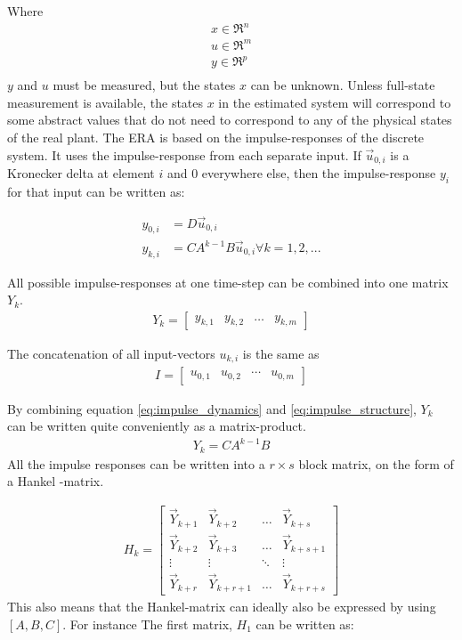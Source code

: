 Where 
\begin{align*}
    x \in \Re^n \\
    u \in \Re^m \\
    y \in \Re^p \\
\end{align*}
\noindent
$y$ and $u$ must be measured, but the states $x$ can be unknown. Unless full-state measurement is available, the states $x$ in the estimated system will correspond to some abstract values that do not need to correspond to any of the physical states of the real plant. The ERA is based on the impulse-responses of the discrete system. It uses the impulse-response from each separate input. If $\vec{u}_{0,i}$ is a Kronecker delta at element $i$ and 0 everywhere else, then the impulse-response $y_i$ for that input can be written as:

\begin{align}
    y_{0,i} &= D \vec{u}_{0,i} \\
    y_{k,i} &= C A^{k-1} B \vec{u}_{0,i} \forall k = 1,2,...
    \label{eq:impulse_dynamics}
\end{align}

All possible impulse-responses at one time-step can be combined into one matrix $Y_{k}$. 
\begin{align}
    Y_{k} = 
    \begin{bmatrix}
        y_{k,1} & y_{k,2} & \dots & y_{k,m}
    \end{bmatrix}
\end{align}


\noindent

The concatenation of all input-vectors $u_{k,i}$ is the same as 
\begin{align}
    I = \begin{bmatrix} u_{0,1} & u_{0,2} & \cdots & u_{0,m} \end{bmatrix}    
    \label{eq:impulse_structure}
\end{align}

By combining equation \ref{eq:impulse_dynamics} and \ref{eq:impulse_structure}, $Y_{k}$ can be written quite conveniently as a matrix-product. 
\begin{align}
    Y_{k} = C A^{k-1} B
\end{align}
All the impulse responses can be written into a $r \times s$ block matrix, on the form of a Hankel -matrix. 

\begin{align}
    H_k = \begin{bmatrix}
        \vec{Y}_{k+1} & \vec{Y}_{k+2} & \dots & \vec{Y}_{k+s}\\ 
        \vec{Y}_{k+2} & \vec{Y}_{k+3} & \dots & \vec{Y}_{k+s+1}\\
        \vdots & \vdots & \ddots & \vdots\\
        \vec{Y}_{k+r} & \vec{Y}_{k+r+1} & \dots & \vec{Y}_{k+r+s}
    \end{bmatrix}
\end{align}
This also means that the Hankel-matrix can ideally also be expressed by using $\left[ A,B,C \right]$. For instance The first matrix, $H_1$ can be written as: 

